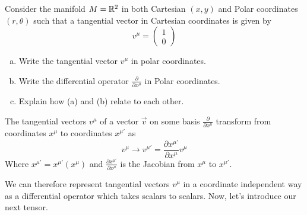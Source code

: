 \documentclass{article}
\begin{document}
 			\begin{exe}
 				Consider the manifold $M = \mathbb{R}^2$ in both Cartesian $(x,y)$ and Polar coordinates $(r, \theta)$ such that a tangential vector in Cartesian coordinates is given by
 				$$ v^\mu = \begin{pmatrix}
 					1 \\ 0
 				\end{pmatrix}$$
 			\begin{enumerate}[(a)]
 				\item Write the tangential vector $v^{\mu}$ in polar coordinates.
 				\item Write the differential operator $\frac{\partial}{\partial x^\mu}$ in Polar coordinates.
 				\item Explain how (a) and (b) relate to each other.
 			\end{enumerate}
 			\end{exe}
 			\begin{thm}
 				The tangential vectors $v^\mu$ of a vector $\vec{v}$ on some basis $\frac{\partial}{\partial x^\mu}$ transform from coordinates $x^\mu$ to coordinates $x^{\mu'}$ as
 				$$ v^\mu \to v^{\mu'} = \frac{\partial x^{\mu'} }{\partial x^\mu} v^\mu$$
 				Where $x^{\mu'} = x^{\mu'} (x^\mu)$ and $\frac{\partial x^{\mu'} }{\partial x^\mu}$ is the Jacobian from $x^\mu$ to $x^{\mu'}$.
 			\end{thm}
 			We can therefore represent tangential vectors $v^\mu$ in a coordinate independent way as a differential operator which takes scalars to scalars. Now, let's introduce our next tensor.
 			
\end{document}
